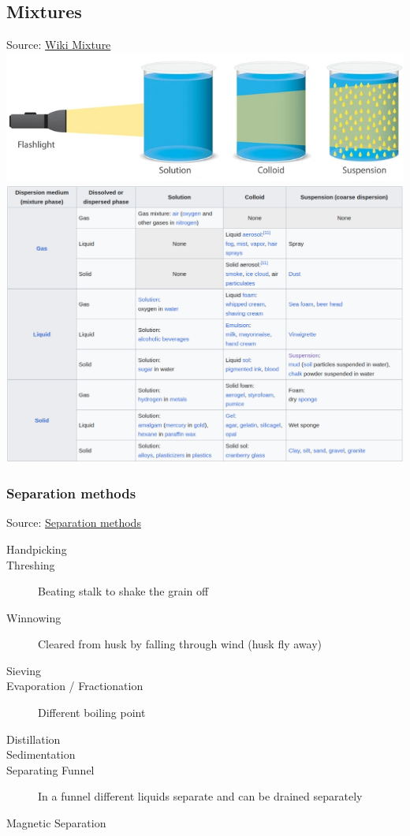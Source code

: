 \subsection{Mixtures}
Source: \href{https://en.wikipedia.org/wiki/Mixture#Homogeneous_and_heterogeneous_mixtures}{Wiki Mixture}
\\
\includegraphics[width=40em]{./includes/chemistry/imgs/colloid.png}\\
\includegraphics[width=\textwidth]{./includes/chemistry/imgs/mixtures.png}

\subsubsection{Separation methods}
Source: \href{https://byjus.com/chemistry/methods-of-separation/}{Separation methods}

\begin{description}
    \item[Handpicking] 
    \item[Threshing] Beating stalk to shake the grain off
    \item[Winnowing] Cleared from husk by falling through wind (husk fly away)
    \item[Sieving]
    \item[Evaporation / Fractionation] Different boiling point 
    \item[Distillation]
    \item[Sedimentation]
    \item[Separating Funnel] In a funnel different liquids separate and can be drained separately 
    \item[Magnetic Separation]
\end{description}